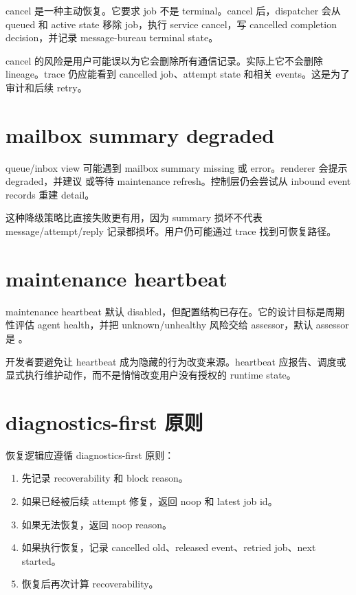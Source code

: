 cancel 是一种主动恢复。它要求 job 不是 terminal。cancel 后，dispatcher 会从 queued 和 active state 移除 job，执行 service cancel，写 cancelled completion decision，并记录 message-bureau terminal state。

cancel 的风险是用户可能误以为它会删除所有通信记录。实际上它不会删除 lineage。trace 仍应能看到 cancelled job、attempt state 和相关 events。这是为了审计和后续 retry。

\section{mailbox summary degraded}

queue/inbox view 可能遇到 mailbox summary missing 或 error。renderer 会提示 degraded，并建议  或等待 maintenance refresh。控制层仍会尝试从 inbound event records 重建 detail。

这种降级策略比直接失败更有用，因为 summary 损坏不代表 message/attempt/reply 记录都损坏。用户仍可能通过 trace 找到可恢复路径。

\section{maintenance heartbeat}

maintenance heartbeat 默认 disabled，但配置结构已存在。它的设计目标是周期性评估 agent health，并把 unknown/unhealthy 风险交给 assessor，默认 assessor 是 。

开发者要避免让 heartbeat 成为隐藏的行为改变来源。heartbeat 应报告、调度或显式执行维护动作，而不是悄悄改变用户没有授权的 runtime state。

\section{diagnostics-first 原则}

恢复逻辑应遵循 diagnostics-first 原则：

\begin{enumerate}
  \item 先记录 recoverability 和 block reason。
  \item 如果已经被后续 attempt 修复，返回 noop 和 latest job id。
  \item 如果无法恢复，返回 noop reason。
  \item 如果执行恢复，记录 cancelled old、released event、retried job、next started。
  \item 恢复后再次计算 recoverability。
\end{enumerate}

